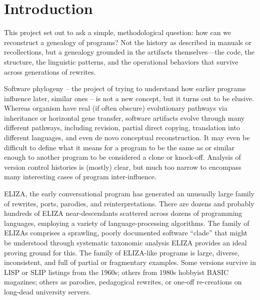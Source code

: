 \documentclass{article}
\begin{document}
\begin{abstract}
The resulting phylogeny reveals two major patterns: a basal polytomy of implementations preserving the complete ELIZA architectural suite across different languages and eras, and a derived clade showing simplifications driven by material constraints (microcomputer BASIC versions), pedagogical purposes (teaching implementations), and different social contexts (hobbyist communities, academic settings, web frameworks). These patterns support interpreting the phylogeny not as a literal genealogy but as a map of a textual tradition—showing how implementations relate through preservation, adaptation, convergence, and critique. The method demonstrates that phylogenetic analysis can reveal the structure of software traditions even when material descent is absent, obscure, or deliberately rejected.

\end{abstract} 

\section{Introduction}

This project set out to ask a simple, methodological question: how can we reconstruct a genealogy of programs? Not the history as described in manuals or recollections, but a genealogy grounded in the artifacts themselves—the code, the structure, the linguistic patterns, and the operational behaviors that survive across generations of rewrites.

Software phylogeny -- the project of trying to understand how earlier programs influence later, similar ones -- is not a new concept, but it turns out to be elusive. Whereas organism have real (if often obscure) evolutionary pathways via inheritance or horizontal gene transfer, software artifacts evolve through many different pathways, including revision, partial direct copying, translation into different languages, and even de novo conceptual reconstruction. It may even be difficult to define what it means for a program to be the same as or similar enough to another program to be considered a clone or knock-off. Analysis of  version control histories is (mostly) clear, but much too narrow to encompass many interesting cases of program inter-influence. 

ELIZA, the early conversational program has generated an unusually large family of rewrites, ports, parodies, and reinterpretations. There are dozens and probably hundreds of ELIZA near-descendants scattered across dozens of programming languages, employing a variety of language-processing algorithms. The family of ELIZAs comprises a sprawling, poorly documented software “clade” that might be understood through systematic taxonomic analysis ELIZA provides an ideal proving ground for this. The family of ELIZA-like programs is large, diverse, inconsistent, and full of partial or fragmentary examples. Some versions survive in LISP or SLIP listings from the 1960s; others from 1980s hobbyist BASIC magazines; others as parodies, pedagogical rewrites, or one-off re-creations on long-dead university servers. 
\end{document}
